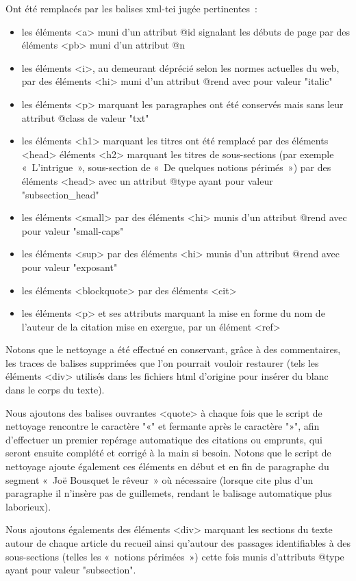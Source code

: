 \documentclass[12pt, a4paper]{article}
\begin{document}
Ont été remplacés par les balises xml-tei jugée pertinentes~:
\begin{itemize}
    \item les éléments <a> muni d'un attribut @id signalant les débuts de page par des éléments <pb> muni d'un attribut @n
    \item les éléments <i>, au demeurant déprécié selon les normes actuelles du web, par des éléments <hi> muni d'un attribut @rend avec pour valeur "italic"
    \item les éléments <p> marquant les paragraphes ont été conservés mais sans leur attribut @class de valeur "txt"
    \item les éléments <h1> marquant les titres ont été remplacé par des éléments <head>
    \les éléments <h2> marquant les titres de sous-sections (par exemple « L'intrigue », sous-section de « De quelques notions périmés ») par des éléments <head> avec un attribut @type ayant pour valeur "subsection_head"
    \item les éléments <small> par des éléments <hi> munis d'un attribut @rend avec pour valeur "small-caps"
    \item les éléments <sup> par des éléments <hi> munis d'un attribut @rend avec pour valeur "exposant"
    \item les éléments <blockquote> par des éléments <cit>
    \item les éléments <p> et ses attributs marquant la mise en forme du nom de l'auteur de la citation mise en exergue, par un élément <ref>
\end{itemize}

Notons que le nettoyage a été effectué en conservant, grâce à des commentaires, les traces de balises supprimées que l'on pourrait vouloir restaurer (tels les éléments <div> utilisés dans les fichiers html d'origine pour insérer du blanc dans le corps du texte).

Nous ajoutons des balises ouvrantes <quote> à chaque fois que le script de nettoyage rencontre le caractère "«" et fermante après le caractère "»", afin d'effectuer un premier repérage automatique des citations ou emprunts, qui seront ensuite complété et corrigé à la main si besoin. Notons que le script de nettoyage ajoute également ces éléments en début et en fin de paragraphe du segment «~Joë Bousquet le rêveur~» où nécessaire (lorsque \robbe{} cite plus d'un paragraphe il n'insère pas de guillemets, rendant le balisage automatique plus laborieux).

Nous ajoutons égalements des éléments <div> marquant les sections du texte autour de chaque article du recueil ainsi qu'autour des passages identifiables à des sous-sections (telles les «~notions périmées~») cette fois munis d'attributs @type ayant pour valeur "subsection".
\end{document}
